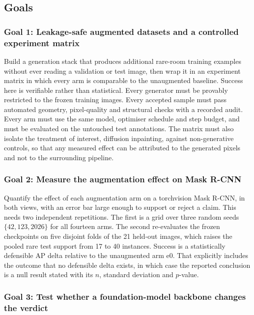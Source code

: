 \subsection{Goals}

\subsubsection{Goal 1: Leakage-safe augmented datasets and a controlled experiment matrix}

Build a generation stack that produces additional rare-room training examples
without ever reading a validation or test image, then wrap it in an experiment
matrix in which every arm is comparable to the unaugmented baseline. Success
here is verifiable rather than statistical. Every generator must be provably
restricted to the frozen training images. Every accepted sample must pass
automated geometry, pixel-quality and structural checks with a recorded audit.
Every arm must use the same model, optimiser schedule and step budget, and must
be evaluated on the untouched test annotations. The matrix must also isolate the
treatment of interest, diffusion inpainting, against non-generative controls, so
that any measured effect can be attributed to the generated pixels and not to
the surrounding pipeline.

\subsubsection{Goal 2: Measure the augmentation effect on Mask R-CNN}

Quantify the effect of each augmentation arm on a torchvision Mask R-CNN, in
both views, with an error bar large enough to support or reject a claim. This
needs two independent repetitions. The first is a grid over three random seeds
$\{42, 123, 2026\}$ for all fourteen arms. The second re-evaluates the frozen
checkpoints on five disjoint folds of the 21 held-out images, which raises the
pooled rare test support from 17 to 40 instances. Success is a statistically
defensible AP delta relative to the unaugmented arm e0. That explicitly includes
the outcome that no defensible delta exists, in which case the reported
conclusion is a null result stated with its $n$, standard deviation and
$p$-value.

\subsubsection{Goal 3: Test whether a foundation-model backbone changes the verdict}


